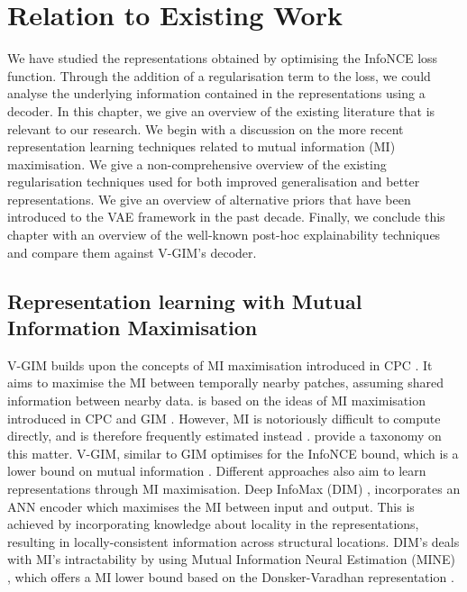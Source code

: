 \chapter{Relation to Existing Work} \label{cha:5}
We have studied the representations obtained by optimising the InfoNCE loss function. Through the addition of a regularisation term to the loss, we could analyse the underlying information contained in the representations using a decoder. In this chapter, we give an overview of the existing literature that is relevant to our research. We begin with a discussion on the more recent representation learning techniques related to mutual information (MI) maximisation. We give a non-comprehensive overview of the existing regularisation techniques used for both improved generalisation and better representations. We give an overview of alternative priors that have been introduced to the VAE framework in the past decade. Finally, we conclude this chapter with an overview of the well-known post-hoc explainability techniques and compare them against V-GIM's decoder.

\section{Representation learning with Mutual Information Maximisation}
	V-GIM builds upon the concepts of MI maximisation introduced in CPC \cite{oordRepresentationLearningContrastive2019}. It aims to maximise the MI between temporally nearby patches, assuming shared information between nearby data. 
	is based on the ideas of MI maximisation introduced in CPC and GIM \citep{lowePuttingEndEndtoEnd2020a, oordRepresentationLearningContrastive2019}. However, MI is notoriously difficult to compute directly, and is therefore frequently estimated instead \citep{tschannenMutualInformationMaximization2020}. \cite{pooleVariationalBoundsMutual2019} provide a taxonomy on this matter. V-GIM, similar to GIM optimises for the InfoNCE bound, which is a lower bound on mutual information \cite{oordRepresentationLearningContrastive2019}. Different approaches also aim to learn representations through MI maximisation. Deep InfoMax (DIM) \citep{hjelmLearningDeepRepresentations2019}, incorporates an ANN encoder which maximises the MI between input and output. This is achieved by incorporating knowledge about locality in the representations, resulting in locally-consistent information across structural locations. DIM's deals with MI's intractability by using Mutual Information Neural Estimation (MINE) \citep{belghaziMINEMutualInformation2021}, which offers a MI lower bound based on the Donsker-Varadhan representation \citep{donskerAsymptoticEvaluationCertain1976}. 
	
